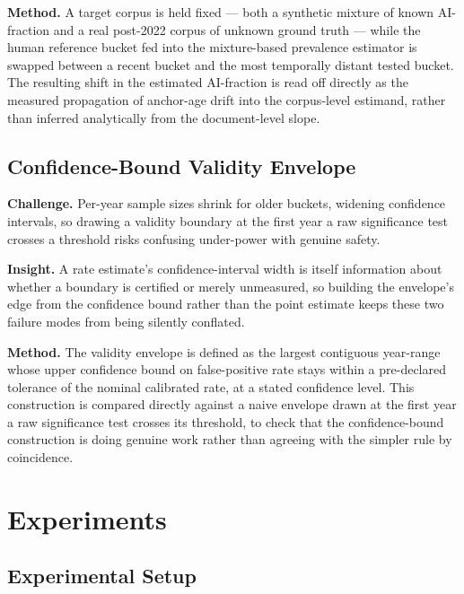 \documentclass[11pt]{article}
\begin{document}
\textbf{Method.} A target corpus is held fixed --- both a synthetic mixture of known AI-fraction and a real post-2022 corpus of unknown ground truth --- while the human reference bucket fed into the mixture-based prevalence estimator is swapped between a recent bucket and the most temporally distant tested bucket. The resulting shift in the estimated AI-fraction is read off directly as the measured propagation of anchor-age drift into the corpus-level estimand, rather than inferred analytically from the document-level slope.

\subsection{Confidence-Bound Validity Envelope}
\textbf{Challenge.} Per-year sample sizes shrink for older buckets, widening confidence intervals, so drawing a validity boundary at the first year a raw significance test crosses a threshold risks confusing under-power with genuine safety.

\textbf{Insight.} A rate estimate's confidence-interval width is itself information about whether a boundary is certified or merely unmeasured, so building the envelope's edge from the confidence bound rather than the point estimate keeps these two failure modes from being silently conflated.

\textbf{Method.} The validity envelope is defined as the largest contiguous year-range whose upper confidence bound on false-positive rate stays within a pre-declared tolerance of the nominal calibrated rate, at a stated confidence level. This construction is compared directly against a naive envelope drawn at the first year a raw significance test crosses its threshold, to check that the confidence-bound construction is doing genuine work rather than agreeing with the simpler rule by coincidence.

\section{Experiments}

\subsection{Experimental Setup}
\end{document}
